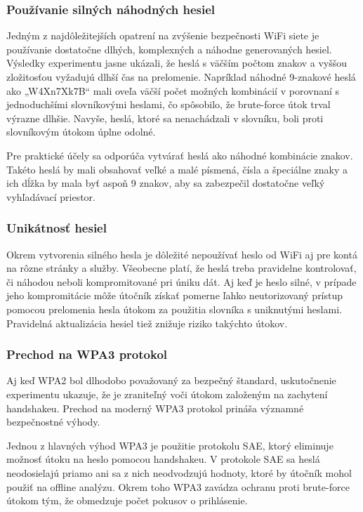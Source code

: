 \documentclass[12pt, twoside]{book}
\begin{document}
\subsubsection{Používanie silných náhodných hesiel}

Jedným z najdôležitejších opatrení na zvýšenie bezpečnosti WiFi siete je používanie dostatočne dlhých, komplexných a náhodne generovaných hesiel. Výsledky experimentu jasne ukázali, že heslá s väčším počtom znakov a vyššou zložitosťou vyžadujú dlhší čas na prelomenie. Napríklad náhodné 9-znakové heslá ako „W4Xn7Xk7B“ mali oveľa väčší počet možných kombinácií v porovnaní s jednoduchšími slovníkovými heslami, čo spôsobilo, že brute-force útok trval výrazne dlhšie. Navyše, heslá, ktoré sa nenachádzali v slovníku, boli proti slovníkovým útokom úplne odolné.

Pre praktické účely sa odporúča vytvárať heslá ako náhodné kombinácie znakov. Takéto heslá by mali obsahovať veľké a malé písmená, čísla a špeciálne znaky a ich dĺžka by mala byť aspoň 9 znakov, aby sa zabezpečil dostatočne veľký vyhľadávací priestor. 

\subsubsection{Unikátnosť hesiel}
Okrem vytvorenia silného hesla je dôležité nepoužívať heslo od WiFi aj pre kontá na rôzne stránky a služby. Všeobecne platí, že heslá treba pravidelne kontrolovať, či náhodou neboli kompromitované pri úniku dát. Aj keď je heslo silné, v prípade jeho kompromitácie môže útočník získať pomerne ľahko neutorizovaný prístup pomocou prelomenia hesla útokom za použitia slovníka s uniknutými heslami. Pravidelná aktualizácia hesiel tiež znižuje riziko takýchto útokov.

\subsubsection{Prechod na WPA3 protokol}
Aj keď WPA2 bol dlhodobo považovaný za bezpečný štandard, uskutočnenie experimentu ukazuje, že je zraniteľný voči útokom založeným na zachytení handshakeu. Prechod na moderný WPA3 protokol prináša významné bezpečnostné výhody.

Jednou z hlavných výhod  WPA3 je použitie protokolu SAE, ktorý eliminuje možnosť útoku na heslo pomocou handshakeu. V protokole SAE sa heslá neodosielajú priamo ani sa z nich neodvodzujú hodnoty, ktoré by útočník mohol použiť na offline analýzu. Okrem toho WPA3 zavádza ochranu proti brute-force útokom tým, že obmedzuje počet pokusov o prihlásenie.


\makeatletter
{}
\makeatother

{}


 



\end{document}
